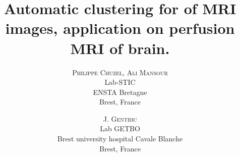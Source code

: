 
\title{\textbf{Automatic clustering for of MRI images, application on perfusion MRI of brain.}}

\author{%
  \textsc{Philippe Chuzel, Ali Mansour}\\%
		\normalsize Lab-STIC\\%
		\normalsize ENSTA Bretagne\\%
		\normalsize Brest, France\\%
\and 
	\textsc{J. Gentric}\\%
		\normalsize Lab GETBO\\%
		\normalsize Brest university hospital Cavale Blanche\\%
		\normalsize Brest, France\\%
  }
  
\date{}



